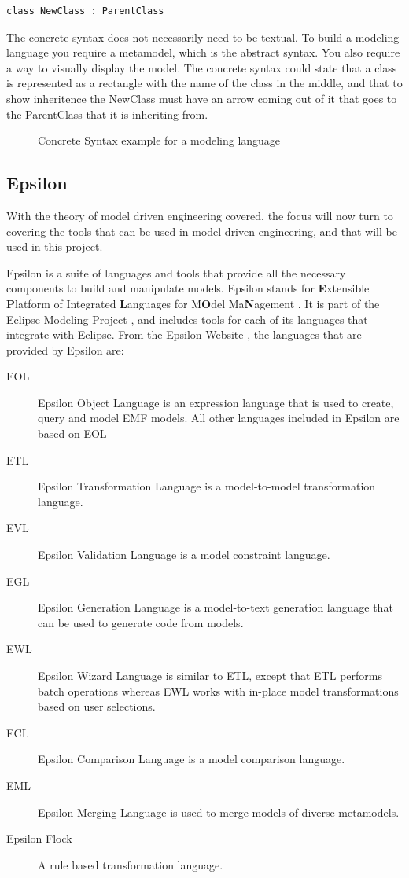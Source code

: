 \begin{lstlisting}
class NewClass : ParentClass
\end{lstlisting}

The concrete syntax does not necessarily need to be textual. To build a modeling language you require a metamodel, which is the abstract syntax. You also require a way to visually display the model. The concrete syntax could state that a class is represented as a rectangle with the name of the class in the middle, and that to show inheritence the NewClass must have an arrow coming out of it that goes to the ParentClass that it is inheriting from.

\begin{figure}[h]
\begin{center}
	\label{concreteSyntaxFigure}
	\caption{Concrete Syntax example for a modeling language}
\end{center}
\end{figure}

\subsection{Epsilon}
With the theory of model driven engineering covered, the focus will now turn to covering the tools that can be used in model driven engineering, and that will be used in this project.

Epsilon is a suite of languages and tools that provide all the necessary components to build and manipulate models. Epsilon stands for \textbf{E}xtensible \textbf{P}latform of Integrated \textbf{L}anguages for M\textbf{O}del Ma\textbf{N}agement \citep{epsilonWebsite}. It is part of the Eclipse Modeling Project \citep{eclipseModelingProjectSite}, and includes tools for each of its languages that integrate with Eclipse. From the Epsilon Website \citep{epsilonWebsite}, the languages that are provided by Epsilon are:

\begin{description}
\item[EOL] Epsilon Object Language is an expression language that is used to create, query and model EMF models. All other languages included in Epsilon are based on EOL \citep{epsilonBook}
\item[ETL] Epsilon Transformation Language is a model-to-model transformation language.
\item[EVL] Epsilon Validation Language is a model constraint language.
\item[EGL] Epsilon Generation Language is a model-to-text generation language that can be used to generate code from models.
\item[EWL] Epsilon Wizard Language is similar to ETL, except that ETL performs batch operations whereas EWL works with in-place model transformations based on user selections.
\item[ECL] Epsilon Comparison Language is a model comparison language.
\item[EML] Epsilon Merging Language is used to merge models of diverse metamodels.
\item[Epsilon Flock] A rule based transformation language.
\end{description}

